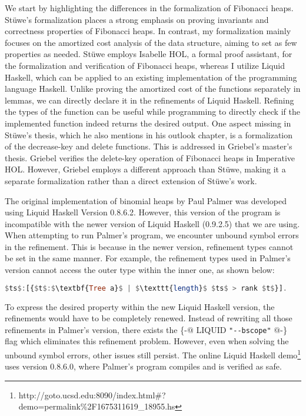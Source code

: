 \documentclass{clmthesis}
\begin{document}
We start by highlighting the differences in the formalization of Fibonacci heaps. Stüwe's formalization places a strong emphasis on proving invariants and correctness properties of Fibonacci heaps. In contrast, my formalization mainly focuses on the amortized cost analysis of the data structure, aiming to set as few properties as needed. Stüwe employs Isabelle HOL, a formal proof assistant, for the formalization and verification of Fibonacci heaps, whereas I utilize Liquid Haskell, which can be applied to an existing implementation of the programming language Haskell. Unlike proving the amortized cost of the functions separately in lemmas, we can directly declare it in the refinements of Liquid Haskell. Refining the types of the function can be useful while programming to directly check if the implemented function indeed returns the desired output.
One aspect missing in Stüwe's thesis, which he also mentions in his outlook chapter, is a formalization of the decrease-key and delete functions. This is addressed in Griebel's master's thesis. Griebel verifies the delete-key operation of Fibonacci heaps in Imperative HOL. However, Griebel employs a different approach than Stüwe, making it a separate formalization rather than a direct extension of Stüwe's work.

The original implementation of binomial heaps by Paul Palmer was developed using Liquid Haskell Version 0.8.6.2. However, this version of the program is incompatible with the newer version of Liquid Haskell (0.9.2.5) that we are using. When attempting to run Palmer's program, we encounter unbound symbol errors in the refinement. This is because in the newer version, refinement types cannot be set in the same manner. For example, the refinement types used in Palmer's version cannot access the outer type within the inner one, as shown below:
\begin{lstlisting}[mathescape=true, language=haskell]
$ts$:[{$t$:$\textbf{Tree a}$ | $\texttt{length}$ $ts$ > rank $t$}].
\end{lstlisting}

To express the desired property within the new Liquid Haskell version, the refinements would have to be completely renewed. Instead of rewriting all those refinements in Palmer's version, there exists the \{-$@$ LIQUID \texttt{"-\;-\;bscope"} $@$-\} flag which eliminates this refinement problem. However, even when solving the unbound symbol errors, other issues still persist. The online Liquid Haskell demo\footnote{http://goto.ucsd.edu:8090/index.html\#?demo=permalink\%2F1675311619\_18955.hs} uses version 0.8.6.0, where Palmer's program compiles and is verified as safe.
\end{document}
